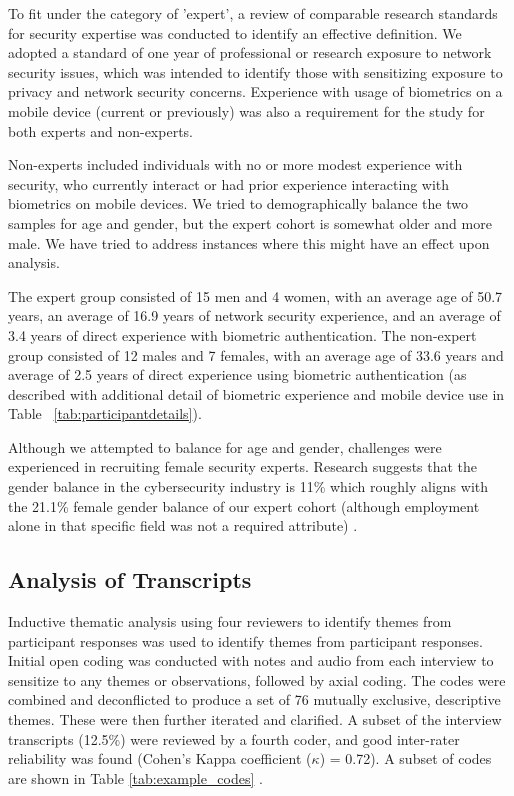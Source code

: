 To fit under the category of 'expert', a review of comparable research standards
for security expertise was conducted to identify an effective
definition. We adopted a standard of one year of professional or research exposure to network security issues, which was intended to identify those with sensitizing exposure to privacy and network security concerns. Experience
with usage of biometrics on a mobile device (current or previously) was also a requirement for the study for both experts and non-experts.

Non-experts included individuals with no or more modest experience with
security, who currently interact or had prior experience interacting with
biometrics on mobile devices.  We tried to demographically balance the two
samples for age and gender, but the expert cohort is somewhat older and more
male. We have tried to address instances where this might have an effect upon
analysis.

The expert group consisted of 15 men and 4 women, with an average age of 50.7
years, an average of 16.9 years of network security experience, and an average
of 3.4 years of direct experience with biometric authentication. The non-expert
group consisted of 12 males and 7 females, with an average age of 33.6 years and
average of 2.5 years of direct experience using biometric authentication (as
described with additional detail of biometric experience and mobile device use
in Table ~\ref{tab:participantdetails}).

Although we attempted to balance for age and gender, challenges were experienced
in recruiting female security experts.  Research suggests that the gender
balance in the cybersecurity industry is 11\% which roughly aligns with the
21.1\% female gender balance of our expert cohort (although employment alone in
that specific field was not a required attribute) \cite{cyber2016}.

\subsection{Analysis of Transcripts}
Inductive thematic analysis using four reviewers to identify themes from
participant responses was used to identify themes from participant
responses. Initial open coding was conducted with notes and audio from each
interview to sensitize to any themes or observations, followed by axial
coding. The codes were combined and deconflicted to produce a set of 76 mutually
exclusive, descriptive themes. These were then further iterated and clarified. A
subset of the interview transcripts (12.5\%) were reviewed by a fourth coder,
and good inter-rater reliability was found (Cohen's Kappa coefficient
(\(\kappa\)) = 0.72). A subset of codes are shown in Table
\ref{tab:example_codes} . %

